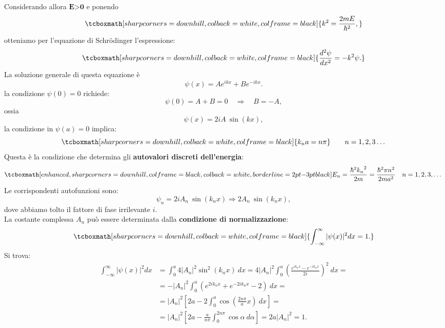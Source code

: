 \documentclass[a4paper,12pt,oneside]{book}
\begin{document}
Considerando allora $\textbf{E>0}$ e ponendo
	\begin{equation}
		\tcboxmath[sharp corners=downhill, colback=white, colframe=black]{
			k ^2 = \frac{2mE}{\hbar ^2},
			}
	\end{equation}
otteniamo per l'equazione di Schr\"{o}dinger l'espressione:
	\begin{equation}
		\tcboxmath[sharp corners=downhill, colback=white, colframe=black]{
			\frac{d^2 \psi}{dx^2}=-k ^2\psi.
			}
	\end{equation}
La soluzione generale di questa equazione è
	\begin{equation}
		\psi(x)= Ae^{ik x}+ Be^{-ik x}.
	\end{equation}
la condizione $\psi (0)=0$ richiede:
	\begin{equation}
		\psi(0)= A+ B=0 \quad \Rightarrow \quad B=-A,
	\end{equation}
ossia
	\begin{equation}
		\psi(x)= 2iA\ \sin{\left( k x \right)},
	\end{equation}
la condizione in $\psi (a)=0$ implica:
	\begin{equation}
		\tcboxmath[sharp corners=downhill, colback=white, colframe=black]{
			k_n a= n\pi
			} \qquad n=1,2,3\dots			
	\end{equation}
Questa è la condizione che determina gli \textbf{autovalori discreti dell'energia}:
	\begin{equation}
		\tcboxmath[enhanced, sharp corners=downhill, colframe=black, colback=white, borderline={2pt}{-3pt}{black}]{
			E_n= \frac{\hbar ^2 {k_n}^2}{2m}=\frac{\hbar ^2 \pi n^2}{2ma^2}
			} \quad n=1,2,3,\dots
	\end{equation}
Le corrispondenti autofunzioni sono:
	\begin{equation}
		\psi _n = 2iA_n\ \sin{\left( k_n x\right)} \Rightarrow 2A_n\ \sin{\left( k_n x \right)},
	\end{equation}
dove abbiamo tolto il fattore di fase irrilevante $i$.\\
La costante complessa $A_n$ può essere determinata dalla \textbf{condizione di normalizzazione}:
	\begin{equation}
		\tcboxmath[sharp corners=downhill, colback=white, colframe=black]{
			\int _{-\infty} ^{\infty} |\psi(x)| ^2 dx =1.
			}
	\end{equation}
Si trova:
	\begin{align}
		\int _{-\infty} ^{\infty} |\psi(x)| ^2 dx &= \int _{0} ^{a} 4|A_n| ^2 \sin ^2 {\left( k_n x \right)}\ dx= 4|A_n| ^2 \int _{0} ^{a} \left( \frac{e^{ik_n x}- e^{-ik_nx}}{2i}\right) ^2\ dx = \nonumber \\ 
		&= -|A_n| ^2 \int _{0} ^{a} \left( e^{2ik_n x}+ e^{-2ik_nx}-2\right)\  dx = \nonumber \\
		&= |A_n| ^2 \left[ 2a- 2 \int _{0} ^{a} \cos \left(\frac{2n \pi}{a} x\right)\   dx \right] = \nonumber \\
		&= |A_n| ^2 \left[ 2a- \frac{a}{n\pi} \int _{0} ^{2n\pi} \cos \alpha\   d\alpha \right] = 2a|A_n|^2= 1.
	\end{align}
\end{document}
